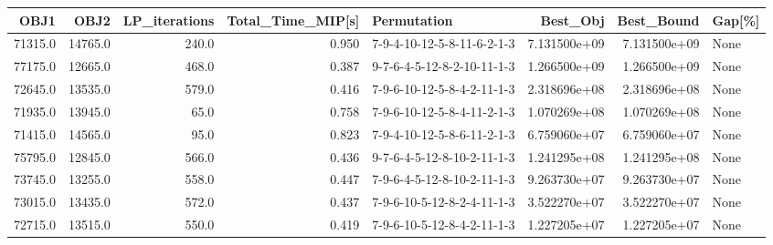 \begin{tabular}{rrrrlrrl}
\toprule
    OBJ1 &     OBJ2 &  LP\_iterations &  Total\_Time\_MIP[s] &                 Permutation &      Best\_Obj &    Best\_Bound & Gap[\%] \\
\midrule
 71315.0 &  14765.0 &          240.0 &              0.950 &  7-9-4-10-12-5-8-11-6-2-1-3 &  7.131500e+09 &  7.131500e+09 &   None \\
 77175.0 &  12665.0 &          468.0 &              0.387 &  9-7-6-4-5-12-8-2-10-11-1-3 &  1.266500e+09 &  1.266500e+09 &   None \\
 72645.0 &  13535.0 &          579.0 &              0.416 &  7-9-6-10-12-5-8-4-2-11-1-3 &  2.318696e+08 &  2.318696e+08 &   None \\
 71935.0 &  13945.0 &           65.0 &              0.758 &  7-9-6-10-12-5-8-4-11-2-1-3 &  1.070269e+08 &  1.070269e+08 &   None \\
 71415.0 &  14565.0 &           95.0 &              0.823 &  7-9-4-10-12-5-8-6-11-2-1-3 &  6.759060e+07 &  6.759060e+07 &   None \\
 75795.0 &  12845.0 &          566.0 &              0.436 &  9-7-6-4-5-12-8-10-2-11-1-3 &  1.241295e+08 &  1.241295e+08 &   None \\
 73745.0 &  13255.0 &          558.0 &              0.447 &  7-9-6-4-5-12-8-10-2-11-1-3 &  9.263730e+07 &  9.263730e+07 &   None \\
 73015.0 &  13435.0 &          572.0 &              0.437 &  7-9-6-10-5-12-8-2-4-11-1-3 &  3.522270e+07 &  3.522270e+07 &   None \\
 72715.0 &  13515.0 &          550.0 &              0.419 &  7-9-6-10-5-12-8-4-2-11-1-3 &  1.227205e+07 &  1.227205e+07 &   None \\
\bottomrule
\end{tabular}
